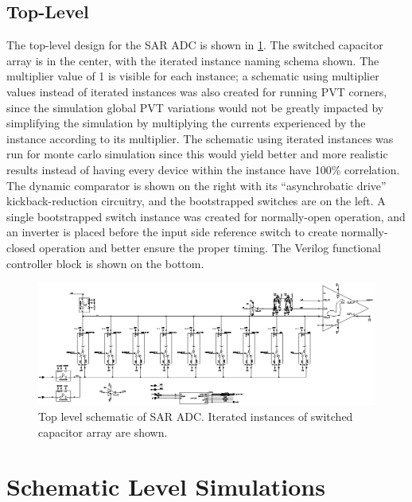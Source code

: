 \documentclass[11pt,letterpaper]{article}
\begin{document}
\subsection{Top-Level}

The top-level design for the SAR ADC is shown in \cref{fig:sar_sch}. The switched capacitor array is in the center, with the iterated instance naming schema shown. The multiplier value of 1 is visible for each instance; a schematic using multiplier values instead of iterated instances was also created for running PVT corners, since the simulation global PVT variations would not be greatly impacted by simplifying the simulation by multiplying the currents experienced by the instance according to its multiplier. The schematic using iterated instances was run for monte carlo simulation since this would yield better and more realistic results instead of having every device within the instance have 100\% correlation. The dynamic comparator is shown on the right with its ``asynchrobatic drive'' kickback-reduction circuitry, and the bootstrapped switches are on the left. A single bootstrapped switch instance was created for normally-open operation, and an inverter is placed before the input side reference switch to create normally-closed operation and better ensure the proper timing. The Verilog functional controller block is shown on the bottom.

\begin{figure}[htbp!]
		\centering
	    \includegraphics[width=\textwidth]{images/sch_sar.eps}
		\caption{Top level schematic of SAR ADC\@. Iterated instances of switched capacitor array are shown.}\label{fig:sar_sch}
\end{figure}

\section{Schematic Level Simulations}
\end{document}
